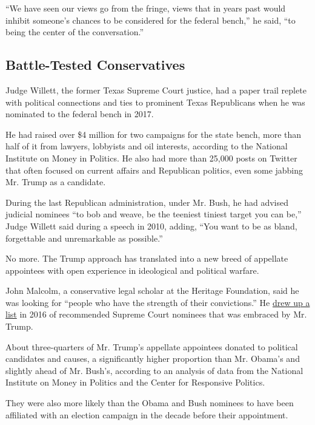 ``We have seen our views go from the fringe, views that in years past
would inhibit someone's chances to be considered for the federal
bench,'' he said, ``to being the center of the conversation.''

\hypertarget{battle-tested-conservatives}{%
\subsection{Battle-Tested
Conservatives}\label{battle-tested-conservatives}}

Judge Willett, the former Texas Supreme Court justice, had a paper trail
replete with political connections and ties to prominent Texas
Republicans when he was nominated to the federal bench in 2017.

He had raised over \$4 million for two campaigns for the state bench,
more than half of it from lawyers, lobbyists and oil interests,
according to the National Institute on Money in Politics. He also had
more than 25,000 posts on Twitter that often focused on current affairs
and Republican politics, even some jabbing Mr. Trump as a candidate.

During the last Republican administration, under Mr. Bush, he had
advised judicial nominees ``to bob and weave, be the teeniest tiniest
target you can be,'' Judge Willett said during a speech in 2010, adding,
``You want to be as bland, forgettable and unremarkable as possible.''

No more. The Trump approach has translated into a new breed of appellate
appointees with open experience in ideological and political warfare.

John Malcolm, a conservative legal scholar at the Heritage Foundation,
said he was looking for ``people who have the strength of their
convictions.'' He
\href{https://www.heritage.org/crime-and-justice/impact/heritage-expert-helps-shape-supreme-court-nominee-list}{drew
up a list} in 2016 of recommended Supreme Court nominees that was
embraced by Mr. Trump.

About three-quarters of Mr. Trump's appellate appointees donated to
political candidates and causes, a significantly higher proportion than
Mr. Obama's and slightly ahead of Mr. Bush's, according to an analysis
of data from the National Institute on Money in Politics and the Center
for Responsive Politics.

They were also more likely than the Obama and Bush nominees to have been
affiliated with an election campaign in the decade before their
appointment.


